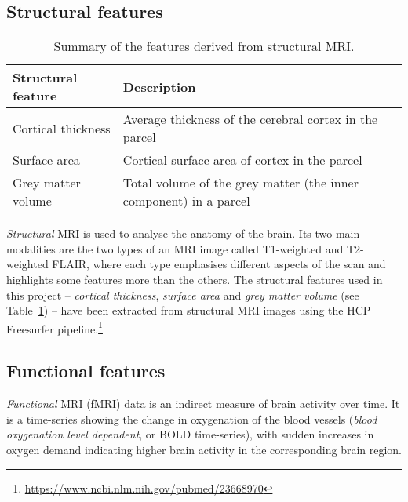 




\subsection{Structural features}

\begin{table}[]
    \centering
    \begin{tabular}{lp{11cm}}
        \hline
    \textbf{Structural feature}            & \textbf{Description} \\ \hline
    Cortical thickness &  Average thickness of the cerebral cortex in the parcel \\
    Surface area       &  Cortical surface area of cortex in the parcel \\
    Grey matter volume &  Total volume of the grey matter (the inner component) in a parcel
    \end{tabular}
    \caption{Summary of the features derived from structural MRI.}\label{table:structural-features}
\end{table}

\textit{Structural} MRI is used to analyse the anatomy of the brain. Its two main modalities are the two types of an MRI image called T1-weighted and T2-weighted FLAIR, where each type emphasises different aspects of the scan and highlights some features more than the others. The structural features used in this project – \textit{cortical thickness}, \textit{surface area} and \textit{grey matter volume} (see Table~\ref{table:structural-features}) – have been extracted from structural MRI images using the HCP Freesurfer pipeline.\footnote{\url{https://www.ncbi.nlm.nih.gov/pubmed/23668970}} 



\subsection{Functional features}
\label{fmri}

\textit{Functional} MRI (fMRI) data is an indirect measure of brain activity over time. It is a time-series showing the change in oxygenation of the blood vessels (\textit{blood oxygenation level dependent}, or BOLD time-series), with sudden increases in oxygen demand indicating higher brain activity in the corresponding brain region.


